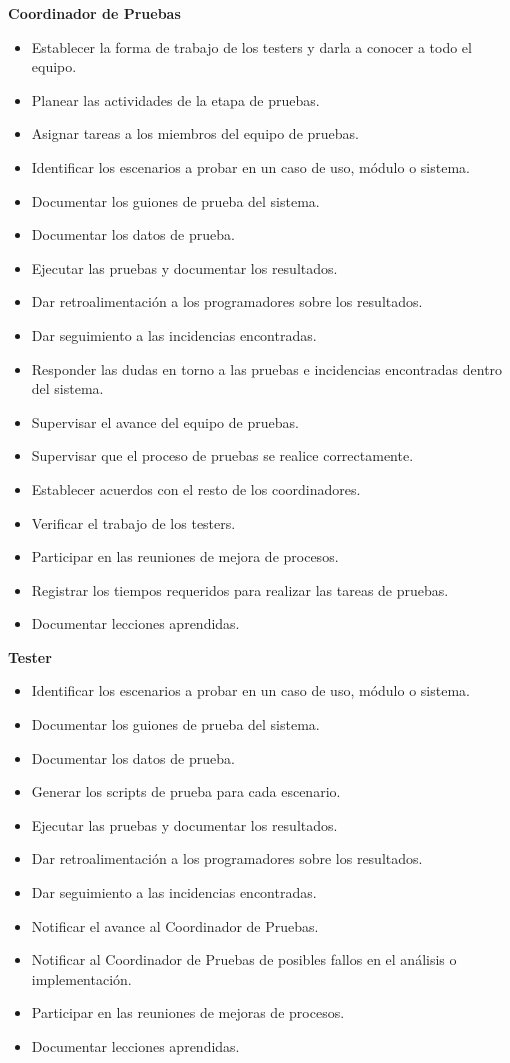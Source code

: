 \documentclass[10pt]{article}
\begin{document}
\textbf{Coordinador de Pruebas}
\begin{itemize}
 \item Establecer la forma de trabajo de los testers y darla a conocer a todo el equipo.
 \item Planear las actividades de la etapa de pruebas.
 \item Asignar tareas a los miembros del equipo de pruebas.
 \item Identificar los escenarios a probar en un caso de uso, módulo o sistema.
 \item Documentar los guiones de prueba del sistema.
 \item Documentar los datos de prueba.
 \item Ejecutar las pruebas y documentar los resultados.
 \item Dar retroalimentación a los programadores sobre los resultados.
 \item Dar seguimiento a las incidencias encontradas.
 \item Responder las dudas en torno a las pruebas e incidencias encontradas dentro del sistema.
 \item Supervisar el avance del equipo de pruebas.
 \item Supervisar que el proceso de pruebas se realice correctamente.
 \item Establecer acuerdos con el resto de los coordinadores.
 \item Verificar el trabajo de los testers.
 \item Participar en las reuniones de mejora de procesos.
 \item Registrar los tiempos requeridos para realizar las tareas de pruebas.
 \item Documentar lecciones aprendidas.\\
\end{itemize}
\newpage 
\textbf{Tester}
\begin{itemize}
 \item Identificar los escenarios a probar en un caso de uso, módulo o sistema.
 \item Documentar los guiones de prueba del sistema.
 \item Documentar los datos de prueba.
 \item Generar los scripts de prueba para cada escenario.
 \item Ejecutar las pruebas y documentar los resultados.
 \item Dar retroalimentación a los programadores sobre los resultados.
 \item Dar seguimiento a las incidencias encontradas.
 \item Notificar el avance al Coordinador de Pruebas.
 \item Notificar al Coordinador de Pruebas de posibles fallos en el análisis o implementación.
 \item Participar en las reuniones de mejoras de procesos.
 \item Documentar lecciones aprendidas.\\
\end{itemize}
\end{document}
